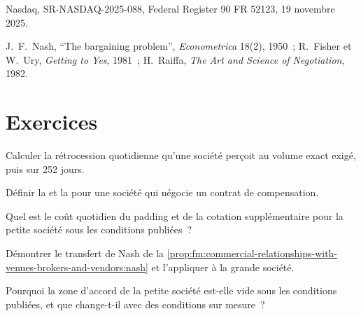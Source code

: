 \begin{omsources}
\item Nasdaq, SR-NASDAQ-2025-088, Federal Register 90 FR 52123, 19 novembre 2025.
\item J.~F.~Nash, ``The bargaining problem'', \emph{Econometrica} 18(2), 1950~; R.~Fisher et W.~Ury, \emph{Getting to Yes}, 1981~; H.~Raiffa,
\emph{The Art and Science of Negotiation}, 1982.
\end{omsources}

\section{Exercices}

\begin{exercise}[$\star$]\label{exo:fm:commercial-relationships-with-venues-brokers-and-vendors:1}
Calculer la rétrocession quotidienne qu'une société perçoit au volume exact exigé, puis sur 252 jours.
\end{exercise}

\begin{exercise}[$\star$]\label{exo:fm:commercial-relationships-with-venues-brokers-and-vendors:2}
Définir la  et la  pour une société qui négocie un contrat de compensation.
\end{exercise}

\begin{exercise}[$\star$]\label{exo:fm:commercial-relationships-with-venues-brokers-and-vendors:3}
Quel est le coût quotidien du padding et de la cotation supplémentaire pour la petite société sous les conditions publiées~?
\end{exercise}

\begin{exercise}[$\star\star$]\label{exo:fm:commercial-relationships-with-venues-brokers-and-vendors:4}
Démontrer le transfert de Nash de la \cref{prop:fm:commercial-relationships-with-venues-brokers-and-vendors:nash} et l'appliquer à la grande société.
\end{exercise}

\begin{exercise}[$\star\star$]\label{exo:fm:commercial-relationships-with-venues-brokers-and-vendors:5}
Pourquoi la zone d'accord de la petite société est-elle vide sous les conditions publiées, et que change-t-il avec des conditions sur mesure~?
\end{exercise}

